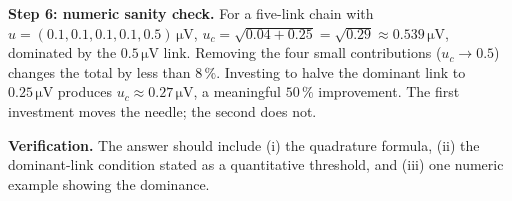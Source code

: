 \begin{exercise}
\textbf{Step 6: numeric sanity check.} For a five-link chain with
$u = (0.1, 0.1, 0.1, 0.1, 0.5) \,\si{\micro\volt}$, $u_{c} =
\sqrt{0.04 + 0.25} = \sqrt{0.29} \approx 0.539 \,\si{\micro\volt}$,
dominated by the $0.5 \,\si{\micro\volt}$ link. Removing the four
small contributions ($u_{c} \to 0.5$) changes the total by less
than $8\,\%$. Investing to halve the dominant link to
$0.25 \,\si{\micro\volt}$ produces $u_{c} \approx 0.27 \,\si{\micro
\volt}$, a meaningful $50\,\%$ improvement. The first investment
moves the needle; the second does not.

\textbf{Verification.} The answer should include (i) the quadrature
formula, (ii) the dominant-link condition stated as a quantitative
threshold, and (iii) one numeric example showing the dominance.
\end{exercise}

